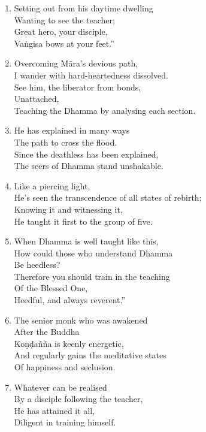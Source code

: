 \documentclass[10pt, openany]{book}
\newcommand*{\vleftofline}[1]{\leavevmode\llap{#1}}
\begin{document}
\begin{enumerate}
\item Setting out from his daytime dwelling\\
Wanting to see the teacher;\\
Great hero, your disciple,\\
Vaṅgisa bows at your feet.”

\item \vleftofline{“}Overcoming Māra’s devious path,\\
I wander with hard-heartedness dissolved.\\
See him, the liberator from bonds,\\
Unattached, \\
Teaching the Dhamma by analysing each section.

\item He has explained in many ways\\
The path to cross the flood.\\
Since the deathless has been explained,\\
The seers of Dhamma stand unshakable.

\item Like a piercing light,\\
He’s seen the transcendence of all states of rebirth;\\
Knowing it and witnessing it,\\
He taught it first to the group of five.

\item When Dhamma is well taught like this,\\
How could those who understand Dhamma \\
Be heedless?\\
Therefore you should train in the teaching \\
Of the Blessed One,\\
Heedful, and always reverent.”

\item \vleftofline{“}The senior monk who was awakened \\
After the Buddha\\
Koṇḍañña is keenly energetic,\\
And regularly gains the meditative states\\
Of happiness and seclusion.

\item Whatever can be realised\\
By a disciple following the teacher,\\
He has attained it all,\\
Diligent in training himself.


\end{enumerate}
\end{document}
